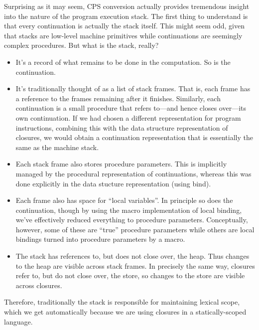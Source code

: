 
Surprising as it may seem, CPS conversion actually provides tremendous insight
into the nature of the program execution stack. The first thing to understand is
that every continuation is actually the stack itself. This might seem odd, given
that stacks are low-level machine primitives while continuations are seemingly
complex procedures. But what is the stack, really?
\begin{itemize}
  \item 
It’s a record of what remains to be done in the computation. So is the
continuation.
  \item 
It’s traditionally thought of as a list of stack frames. That is, each frame has
a reference to the frames remaining after it finishes. Similarly, each
continuation is a small procedure that refers to—and hence closes over—its own
continuation. If we had chosen a different representation for program
instructions, combining this with the data structure representation of closures,
we would obtain a continuation representation that is essentially the same as
the machine stack.
  \item 
Each stack frame also stores procedure parameters. This is implicitly managed by
the procedural representation of continuations, whereas this was done explicitly
in the data stucture representation (using bind).
  \item 
Each frame also has space for “local variables”. In principle so does the
continuation, though by using the macro implementation of local binding, we’ve
effectively reduced everything to procedure parameters. Conceptually, however,
some of these are “true” procedure parameters while others are local bindings
turned into procedure parameters by a macro.
  \item 
The stack has references to, but does not close over, the heap. Thus changes to
the heap are visible across stack frames. In precisely the same way, closures
refer to, but do not close over, the store, so changes to the store are visible
across closures.
\end{itemize}
Therefore, traditionally the stack is responsible for maintaining lexical scope,
which we get automatically because we are using closures in a statically-scoped
language.

